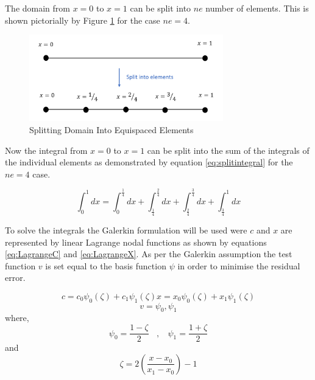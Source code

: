 \documentclass[11pt]{article}
\begin{document}
The domain from $x = 0$ to $ x = 1$ can be split into $ne$ number of elements. This is shown pictorially by Figure \ref{fig:domain2elements} for the case $ne = 4$.

\begin{figure}[h!]
\centering
\includegraphics[width=0.75\textwidth]{SplitIntoElements.PNG}
\caption{Splitting Domain Into Equispaced Elements}\label{fig:domain2elements}
\end{figure}

\pagebreak

Now the integral from $x = 0$ to $x = 1$ can be split into the sum of the integrals of the individual elements as demonstrated by equation \ref{eq:splitintegral} for the $ne = 4$ case.


\begin{equation}
\label{eq:splitintegral}
\int_0^1 dx = \int_0^\frac{1}{4}  dx + \int_\frac{1}{4}^\frac{2}{4}  dx + \int_\frac{2}{4}^\frac{3}{4}  dx + \int_\frac{3}{4}^1  dx
\end{equation}

To solve the integrals the Galerkin formulation will be used were $c$ and $x$ are represented by linear Lagrange nodal functions as shown by equations \ref{eq:LagrangeC} and \ref{eq:LagrangeX}. As per the Galerkin assumption the test function $v$ is set equal to the basis function $\psi$ in order to minimise the residual error.




\begin{subequations}
\begin{equation}
\label{eq:LagrangeC}
c = c_{0}\psi_{0}(\zeta) + c_1\psi_{1}(\zeta) 
\end{equation}
\begin{equation}
\label{eq:LagrangeX}
x = x_{0}\psi_{0}(\zeta) + x_1\psi_{1}(\zeta)  
\end{equation}
\end{subequations}
\begin{equation}
\label{eq:LagrangeV}
v  = \psi_{0} , \psi_{1} 
\end{equation} 
where,
\begin{equation}
\label{eq:LagrangePSI}
\psi_{0} = \frac{1 - \zeta}{2} \ \ \ \ ,  \ \ \ \ \psi_{1} = \frac{1 + \zeta}{2} 
\end{equation}
and
\begin{equation}
\label{eq:LagrangeZeta}
\zeta   = 2 \left(\frac{x - x_0}{x_1 - x_0}\right) - 1 
\end{equation}
\end{document}

